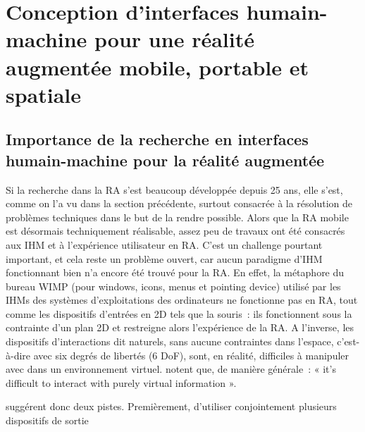 \section*{Conception d'interfaces humain-machine pour une réalité augmentée mobile, portable et spatiale}
\subsection*{Importance de la recherche en interfaces humain-machine pour la réalité augmentée}
Si la recherche dans la RA s'est beaucoup développée depuis 25 ans, elle s'est, comme on l'a vu dans la section précédente, surtout consacrée à la résolution de problèmes techniques dans le but de la rendre possible. Alors que la RA mobile est désormais techniquement réalisable, assez peu de travaux ont été consacrés aux IHM et à l'expérience utilisateur en RA. \citep{DeSaChurchill2013} C'est un challenge pourtant important, et cela reste un problème ouvert, car aucun paradigme d'IHM fonctionnant bien n'a encore été trouvé pour la RA. \citep{VanKrevelenPoelman2010} En effet, la métaphore du bureau WIMP (pour \foreignlanguage{english}{windows}, \foreignlanguage{english}{icons}, \foreignlanguage{english}{menus} et \foreignlanguage{english}{pointing device}) utilisé par les IHMs des systèmes d'exploitations des ordinateurs ne fonctionne pas en RA, tout comme les dispositifs d'entrées en 2D tels que la souris~: ils fonctionnent sous la contrainte d'un plan 2D et restreigne alors l'expérience de la RA. \citep{VanKrevelenPoelman2010} A l'inverse, les dispositifs d'interactions dit naturels, sans aucune contraintes dans l'espace, c'est-à-dire avec six degrés de libertés (6 DoF), sont, en réalité, difficiles à manipuler avec dans un environnement virtuel. \citet{AzumaBaillotBehringerEtAl2001} notent que, de manière générale~: « it’s difficult to interact with purely virtual information ». 

\citet{AzumaBaillotBehringerEtAl2001} suggérent donc deux pistes. Premièrement, d'utiliser conjointement plusieurs dispositifs de sortie



